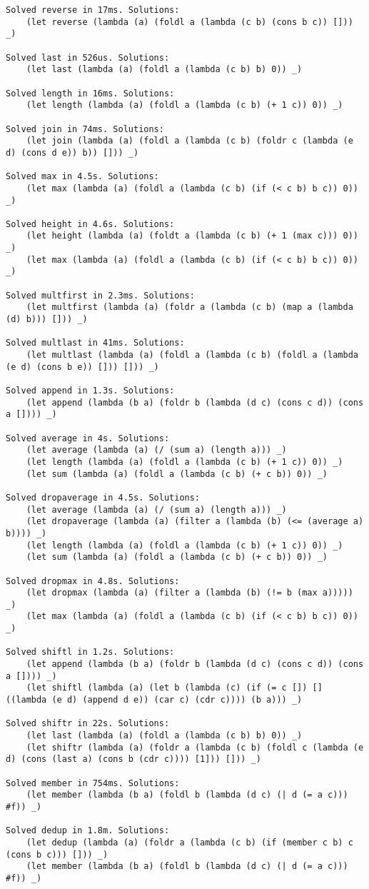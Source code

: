 \documentclass[11pt]{article}
\begin{document}
\begin{lstlisting}
Solved reverse in 17ms. Solutions:
	(let reverse (lambda (a) (foldl a (lambda (c b) (cons b c)) [])) _)

Solved last in 526us. Solutions:
	(let last (lambda (a) (foldl a (lambda (c b) b) 0)) _)

Solved length in 16ms. Solutions:
	(let length (lambda (a) (foldl a (lambda (c b) (+ 1 c)) 0)) _)

Solved join in 74ms. Solutions:
	(let join (lambda (a) (foldl a (lambda (c b) (foldr c (lambda (e d) (cons d e)) b)) [])) _)

Solved max in 4.5s. Solutions:
	(let max (lambda (a) (foldl a (lambda (c b) (if (< c b) b c)) 0)) _)

Solved height in 4.6s. Solutions:
	(let height (lambda (a) (foldt a (lambda (c b) (+ 1 (max c))) 0)) _)
	(let max (lambda (a) (foldl a (lambda (c b) (if (< c b) b c)) 0)) _)

Solved multfirst in 2.3ms. Solutions:
	(let multfirst (lambda (a) (foldr a (lambda (c b) (map a (lambda (d) b))) [])) _)

Solved multlast in 41ms. Solutions:
	(let multlast (lambda (a) (foldl a (lambda (c b) (foldl a (lambda (e d) (cons b e)) [])) [])) _)

Solved append in 1.3s. Solutions:
	(let append (lambda (b a) (foldr b (lambda (d c) (cons c d)) (cons a []))) _)

Solved average in 4s. Solutions:
	(let average (lambda (a) (/ (sum a) (length a))) _)
	(let length (lambda (a) (foldl a (lambda (c b) (+ 1 c)) 0)) _)
	(let sum (lambda (a) (foldl a (lambda (c b) (+ c b)) 0)) _)

Solved dropaverage in 4.5s. Solutions:
	(let average (lambda (a) (/ (sum a) (length a))) _)
	(let dropaverage (lambda (a) (filter a (lambda (b) (<= (average a) b)))) _)
	(let length (lambda (a) (foldl a (lambda (c b) (+ 1 c)) 0)) _)
	(let sum (lambda (a) (foldl a (lambda (c b) (+ c b)) 0)) _)

Solved dropmax in 4.8s. Solutions:
	(let dropmax (lambda (a) (filter a (lambda (b) (!= b (max a))))) _)
	(let max (lambda (a) (foldl a (lambda (c b) (if (< c b) b c)) 0)) _)

Solved shiftl in 1.2s. Solutions:
	(let append (lambda (b a) (foldr b (lambda (d c) (cons c d)) (cons a []))) _)
	(let shiftl (lambda (a) (let b (lambda (c) (if (= c []) [] ((lambda (e d) (append d e)) (car c) (cdr c)))) (b a))) _)

Solved shiftr in 22s. Solutions:
	(let last (lambda (a) (foldl a (lambda (c b) b) 0)) _)
	(let shiftr (lambda (a) (foldr a (lambda (c b) (foldl c (lambda (e d) (cons (last a) (cons b (cdr c)))) [1])) [])) _)

Solved member in 754ms. Solutions:
	(let member (lambda (b a) (foldl b (lambda (d c) (| d (= a c))) #f)) _)

Solved dedup in 1.8m. Solutions:
	(let dedup (lambda (a) (foldr a (lambda (c b) (if (member c b) c (cons b c))) [])) _)
	(let member (lambda (b a) (foldl b (lambda (d c) (| d (= a c))) #f)) _)
\end{lstlisting}

\label{sec-5}
\end{document}
